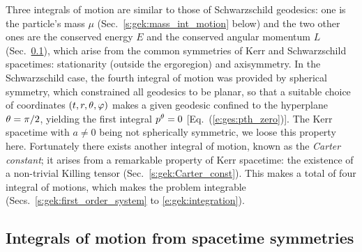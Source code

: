 Three integrals of motion are similar to those of Schwarzschild geodesics:
one is the particle's mass $\mu$ (Sec.~\ref{s:gek:mass_int_motion} below)
and the two other ones are
the conserved energy $E$ and the conserved angular momentum
$L$ (Sec.~\ref{s:gek:int_motion_sym}), which arise from the common symmetries
of Kerr and Schwarzschild spacetimes: stationarity (outside the ergoregion) and axisymmetry.
In the Schwarzschild case, the fourth integral of motion was provided by
spherical symmetry, which constrained all geodesics to be planar, so that
a suitable choice of
coordinates $(t,r,\theta,\varphi)$ makes a given geodesic confined to the
hyperplane $\theta=\pi/2$, yielding the first integral $p^\theta=0$ [Eq.~(\ref{e:ges:pth_zero})].
The Kerr spacetime with $a\not=0$ being not spherically symmetric, we loose
this property here. Fortunately there exists another
integral of motion, known as the \emph{Carter constant}; it arises from a remarkable property
of Kerr spacetime: the existence of a non-trivial Killing tensor (Sec.~\ref{s:gek:Carter_const}).
This makes a total of four integral of motions,
which makes the problem integrable (Secs.~\ref{s:gek:first_order_system} to
\ref{e:gek:integration}).


\subsection{Integrals of motion from spacetime symmetries} \label{s:gek:int_motion_sym}

